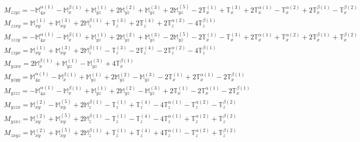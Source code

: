 \documentclass[fleqn,8pt,landscape]{jsarticle}
\begin{document}
\begin{align*}
& M_{zzyz} = - \mathbb{M}_{4x}^{\alpha(1)} - \mathbb{M}_{x}^{\beta(1)} + \mathbb{M}_{yz}^{(1)} + 2 \mathbb{M}_{yz}^{(2)} + \mathbb{M}_{yz}^{(3)} + 2 \mathbb{M}_{yz}^{(5)} - 2 \mathbb{T}_{x}^{(1)} + \mathbb{T}_{x}^{(3)} + 2 \mathbb{T}_{x}^{\alpha(1)} - \mathbb{T}_{x}^{\alpha(2)} + 2 \mathbb{T}_{x}^{\beta(1)} - \mathbb{T}_{x}^{\beta(2)} \\
& M_{zzxy} = \mathbb{M}_{xy}^{(1)} + \mathbb{M}_{xy}^{(3)} + 2 \mathbb{M}_{z}^{\beta(1)} + \mathbb{T}_{z}^{(3)} + 2 \mathbb{T}_{z}^{(4)} + 2 \mathbb{T}_{z}^{\alpha(2)} - 4 \mathbb{T}_{z}^{\beta(1)} \\
& M_{zzzy} = - \mathbb{M}_{4x}^{\alpha(1)} - \mathbb{M}_{x}^{\beta(1)} + \mathbb{M}_{yz}^{(1)} + 2 \mathbb{M}_{yz}^{(2)} + \mathbb{M}_{yz}^{(3)} - 2 \mathbb{M}_{yz}^{(5)} - 2 \mathbb{T}_{x}^{(1)} - \mathbb{T}_{x}^{(3)} + 2 \mathbb{T}_{x}^{\alpha(1)} + \mathbb{T}_{x}^{\alpha(2)} + 2 \mathbb{T}_{x}^{\beta(1)} + \mathbb{T}_{x}^{\beta(2)} \\
& M_{zzyx} = \mathbb{M}_{xy}^{(1)} + \mathbb{M}_{xy}^{(3)} + 2 \mathbb{M}_{z}^{\beta(1)} - \mathbb{T}_{z}^{(3)} - 2 \mathbb{T}_{z}^{(4)} - 2 \mathbb{T}_{z}^{\alpha(2)} - 4 \mathbb{T}_{z}^{\beta(1)} \\
& M_{yzxx} = 2 \mathbb{M}_{x}^{\beta(1)} + \mathbb{M}_{yz}^{(1)} - \mathbb{M}_{yz}^{(3)} + 4 \mathbb{T}_{x}^{\beta(1)} \\
& M_{yzyy} = \mathbb{M}_{4x}^{\alpha(1)} - \mathbb{M}_{x}^{\beta(1)} + \mathbb{M}_{yz}^{(1)} + 2 \mathbb{M}_{yz}^{(2)} - \mathbb{M}_{yz}^{(3)} - 2 \mathbb{T}_{x}^{(1)} + 2 \mathbb{T}_{x}^{\alpha(1)} - 2 \mathbb{T}_{x}^{\beta(1)} \\
& M_{yzzz} = - \mathbb{M}_{4x}^{\alpha(1)} - \mathbb{M}_{x}^{\beta(1)} + \mathbb{M}_{yz}^{(1)} + 2 \mathbb{M}_{yz}^{(2)} - \mathbb{M}_{yz}^{(3)} + 2 \mathbb{T}_{x}^{(1)} - 2 \mathbb{T}_{x}^{\alpha(1)} - 2 \mathbb{T}_{x}^{\beta(1)} \\
& M_{yzzx} = \mathbb{M}_{xy}^{(2)} - \mathbb{M}_{xy}^{(5)} + 2 \mathbb{M}_{z}^{\beta(1)} - \mathbb{T}_{z}^{(1)} + \mathbb{T}_{z}^{(4)} - 4 \mathbb{T}_{z}^{\alpha(1)} - \mathbb{T}_{z}^{\alpha(2)} - \mathbb{T}_{z}^{\beta(2)} \\
& M_{yzxz} = \mathbb{M}_{xy}^{(2)} + \mathbb{M}_{xy}^{(5)} + 2 \mathbb{M}_{z}^{\beta(1)} - \mathbb{T}_{z}^{(1)} - \mathbb{T}_{z}^{(4)} - 4 \mathbb{T}_{z}^{\alpha(1)} + \mathbb{T}_{z}^{\alpha(2)} + \mathbb{T}_{z}^{\beta(2)} \\
& M_{zxyz} = \mathbb{M}_{xy}^{(2)} + \mathbb{M}_{xy}^{(5)} + 2 \mathbb{M}_{z}^{\beta(1)} + \mathbb{T}_{z}^{(1)} + \mathbb{T}_{z}^{(4)} + 4 \mathbb{T}_{z}^{\alpha(1)} - \mathbb{T}_{z}^{\alpha(2)} + \mathbb{T}_{z}^{\beta(2)} \\

\end{align*}
\end{document}
